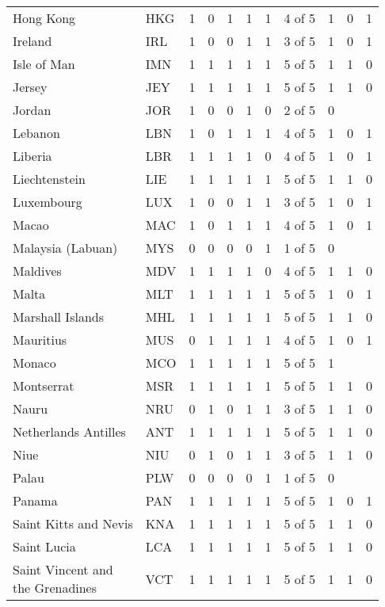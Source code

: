 \documentclass[twoside,a4paper,11pt]{article}
\begin{document}
\begin{minipage}{\linewidth}
{\begin{tabular}{ll|lllll|llll}
		Hong Kong & HKG & 1 & 0 & 1 & 1 & 1 & 4 of 5 & 1 & 0 & 1 \\ 
		Ireland & IRL & 1 & 0 & 0 & 1 & 1 & 3 of 5 & 1 & 0 & 1 \\ 
		Isle of Man & IMN & 1 & 1 & 1 & 1 & 1 & 5 of 5 & 1 & 1 & 0 \\ \hline
		Jersey & JEY & 1 & 1 & 1 & 1 & 1 & 5 of 5 & 1 & 1 & 0 \\ 
		Jordan & JOR & 1 & 0 & 0 & 1 & 0 & 2 of 5 & 0 &  &  \\ 
		Lebanon & LBN & 1 & 0 & 1 & 1 & 1 & 4 of 5 & 1 & 0 & 1 \\ 
		Liberia & LBR & 1 & 1 & 1 & 1 & 0 & 4 of 5 & 1 & 0 & 1 \\ 
		Liechtenstein & LIE & 1 & 1 & 1 & 1 & 1 & 5 of 5 & 1 & 1 & 0 \\ \hline
		Luxembourg & LUX & 1 & 0 & 0 & 1 & 1 & 3 of 5 & 1 & 0 & 1 \\ 
		Macao & MAC & 1 & 0 & 1 & 1 & 1 & 4 of 5 & 1 & 0 & 1 \\ 
		Malaysia (Labuan) & MYS & 0 & 0 & 0 & 0 & 1 & 1 of 5 & 0 &  &  \\ 
		Maldives & MDV & 1 & 1 & 1 & 1 & 0 & 4 of 5 & 1 & 1 & 0 \\ 
		Malta & MLT & 1 & 1 & 1 & 1 & 1 & 5 of 5 & 1 & 0 & 1 \\ \hline
		Marshall Islands & MHL & 1 & 1 & 1 & 1 & 1 & 5 of 5 & 1 & 1 & 0 \\ 
		Mauritius & MUS & 0 & 1 & 1 & 1 & 1 & 4 of 5 & 1 & 0 & 1 \\ 
		Monaco & MCO & 1 & 1 & 1 & 1 & 1 & 5 of 5 & 1 &  &  \\ 
		Montserrat & MSR & 1 & 1 & 1 & 1 & 1 & 5 of 5 & 1 & 1 & 0 \\ 
		Nauru & NRU & 0 & 1 & 0 & 1 & 1 & 3 of 5 & 1 & 1 & 0 \\ \hline
		Netherlands Antilles & ANT & 1 & 1 & 1 & 1 & 1 & 5 of 5 & 1 & 1 & 0 \\ 
		Niue & NIU & 0 & 1 & 0 & 1 & 1 & 3 of 5 & 1 & 1 & 0 \\ 
		Palau & PLW & 0 & 0 & 0 & 0 & 1 & 1 of 5 & 0 &  &  \\ 
		Panama & PAN & 1 & 1 & 1 & 1 & 1 & 5 of 5 & 1 & 0 & 1 \\ 
		Saint Kitts and Nevis & KNA & 1 & 1 & 1 & 1 & 1 & 5 of 5 & 1 & 1 & 0 \\ \hline
		Saint Lucia & LCA & 1 & 1 & 1 & 1 & 1 & 5 of 5 & 1 & 1 & 0 \\ 
		\makecell[l]{Saint Vincent and\\the Grenadines} & VCT & 1 & 1 & 1 & 1 & 1 & 5 of 5 & 1 & 1 & 0 \\ 

\end{tabular}}
\end{minipage}
\end{document}
